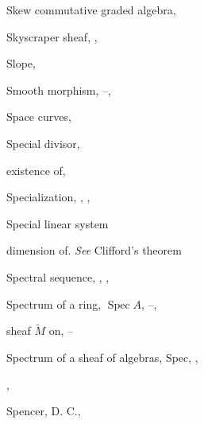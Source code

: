 {{\noindent\hspace*{0.0bp}Skew commutative graded algebra, \par
\noindent\hspace*{0.0bp}Skyscraper sheaf, , \par
\noindent\hspace*{0.0bp}Slope, \par
\noindent\hspace*{0.0bp}Smooth morphism, --, \par
\noindent\hspace*{0.0bp}Space curves, \par
\noindent\hspace*{0.0bp}Special divisor, \par
\noindent\hspace*{7.5bp}existence of, \par
\noindent\hspace*{0.0bp}Specialization, , , \par
\noindent\hspace*{0.0bp}Special linear system\par
\noindent\hspace*{7.5bp}dimension of. \emph{See} Clifford's theorem\par
\noindent\hspace*{0.0bp}Spectral sequence, , , \par
}\hfill%
\parbox[t]{162.5bp}{\fontsize{8.05}{8.49}\selectfont%
\raggedright\setlength{\parskip}{0pt}%
\noindent\hspace*{0.0bp}Spectrum of a ring, $\operatorname{Spec} A$, --, \par
\noindent\hspace*{7.5bp}sheaf $\widetilde M$ on, --\par
\noindent\hspace*{0.0bp}Spectrum of a sheaf of algebras, Spec, ,\par
\noindent\hspace*{15.0bp}, \par
\noindent\hspace*{0.0bp}Spencer, D. C., \par
}}
